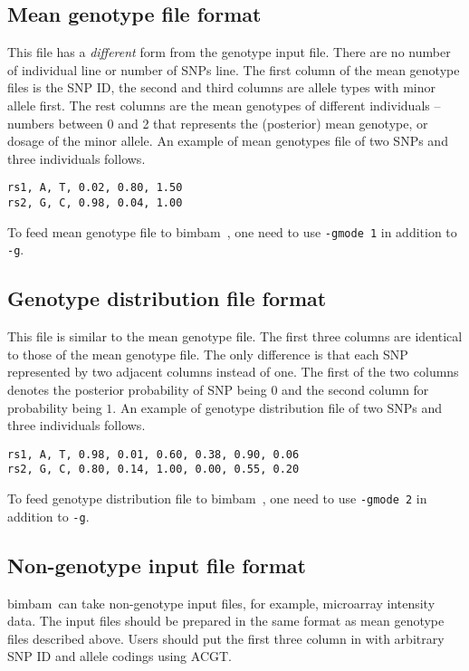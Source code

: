 \documentclass[11pt,Palatino]{article}
\def\bimbam{{\sc bimbam}~}
\begin{document}
\subsection{Mean genotype file format}
This file has a \emph{different} form from the genotype input file.  There are no number of individual line or number of SNPs line. The first column of the mean genotype files is the SNP ID, the second and third columns are allele types with minor allele first. The rest columns are the mean genotypes of different individuals -- numbers between 0 and 2 that represents the (posterior) mean genotype, 
or dosage of the minor allele.  
An example of mean genotypes file of two SNPs and three individuals follows.
\begin{verbatim}
rs1, A, T, 0.02, 0.80, 1.50
rs2, G, C, 0.98, 0.04, 1.00
\end{verbatim}
To feed mean genotype file to \bimbam, one need to use {\tt -gmode 1} in addition to {\tt -g}.

\subsection{Genotype distribution file format}
This file is similar to the mean genotype file. The first three columns are identical to those of the mean genotype file. The only difference is that each SNP represented by two adjacent columns instead of one.  The first of the two columns denotes the posterior probability of SNP being $0$ and the second column for probability being $1$.  An example of genotype distribution file of two SNPs and three individuals follows.

\begin{verbatim}
rs1, A, T, 0.98, 0.01, 0.60, 0.38, 0.90, 0.06
rs2, G, C, 0.80, 0.14, 1.00, 0.00, 0.55, 0.20
\end{verbatim}
To feed genotype distribution file to \bimbam, one need to use {\tt -gmode 2} in addition to {\tt -g}.



\subsection{Non-genotype input file format}
\bimbam can take non-genotype input files, for example, microarray intensity data. The input files should be prepared in the same format as mean genotype files described above. Users should put the first three column in with arbitrary SNP ID and allele codings using ACGT.
\end{document}

